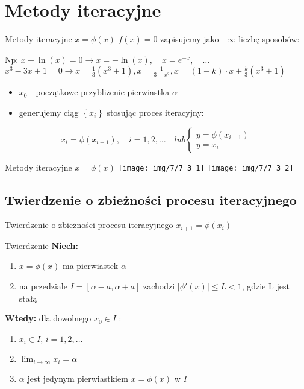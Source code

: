 \section{Metody iteracyjne}
\begin{frame}{Metody iteracyjne $x = \phi(x)$}
	$f(x) = 0$ zapisujemy jako  - $\infty$ liczbę sposobów:\linebreak
	
	Np:\linebreak
	$x + \ln(x) = 0 \rightarrow x = -\ln(x),\quad x = e^{-x},\quad \ldots$
	$x^{3} - 3x + 1 = 0 \rightarrow x = \frac{1}{3}(x^{3} + 1), x = \frac{1}{3 - x^{2}}, x = (1 - k) \cdot x + \frac{k}{3}(x^{3} + 1)$
	
	\begin{itemize}
		\item $x_{0}$ - początkowe przybliżenie pierwiastka $\alpha$
		\item generujemy ciąg $\left\{x_{i}\right\}$ stosując proces iteracyjny:
	\end{itemize}
	\[
		x_{i} = \phi(x_{i-1}),\quad i = 1, 2, \ldots \quad lub
		\begin{cases}
			y = \phi(x_{i-1})\\
			y = x_{i}
		\end{cases}
	\]
\end{frame}
\begin{frame}{Metody iteracyjne $x = \phi(x)$}
	\texttt{[image: img/7/7\_3\_1]}
	\texttt{[image: img/7/7\_3\_2]}
\end{frame}
\subsection{Twierdzenie o zbieżności procesu iteracyjnego}
\begin{frame}{Twierdzenie o zbieżności procesu iteracyjnego $x_{i+1} = \phi(x_{i})$}
	\begin{block}{Twierdzenie}
		\textbf{Niech:}
		\begin{enumerate}
			\item $x = \phi(x)$ ma pierwiastek $\alpha$
			\item na przedziale $I = \left[\alpha - a, \alpha + a\right]$ zachodzi $\lvert \phi'(x) \rvert \leq L < 1$, gdzie L jest stałą
		\end{enumerate}
		\vspace{0.5cm}
		\textbf{Wtedy: } dla dowolnego $x_{0} \in I$ :
		\begin{enumerate}
			\item $x_{i} \in I$, $i = 1, 2, \ldots$
			\item $\lim_{i \rightarrow \infty} x_{i} = \alpha$
			\item $\alpha$ jest jedynym pierwiastkiem $x = \phi(x)$ w $I$
		\end{enumerate}
	\end{block}
\end{frame}


